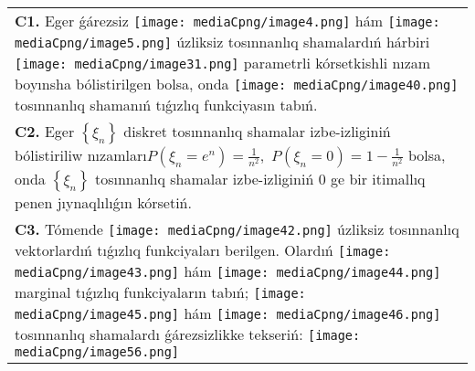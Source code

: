 \documentclass{article}
\begin{document}
\begin{tabular}{m{17cm}}
 \\
\textbf{C1.} Eger ǵárezsiz \texttt{[image: mediaCpng/image4.png]} hám \texttt{[image: mediaCpng/image5.png]} úzliksiz tosınnanlıq shamalardıń hárbiri \texttt{[image: mediaCpng/image31.png]} parametrli
kórsetkishli nızam boyınsha bólistirilgen bolsa, onda \texttt{[image: mediaCpng/image40.png]} tosınnanlıq shamanıń
tıǵızlıq funkciyasın tabıń.
 \\
\textbf{C2.} Eger \(\left\{ \xi_{n} \right\}\) diskret tosınnanlıq shamalar izbe-izliginiń bólistiriliw nızamları\(P(\xi_{n} = e^{n}) = \frac{1}{n^{2}},\) \(P(\xi_{n} = 0) = 1 - \frac{1}{n^{2}}\) bolsa, onda \(\left\{ \xi_{n} \right\}\) tosınnanlıq shamalar izbe-izliginiń 0 ge bir itimallıq penen jıynaqlılıǵın kórsetiń.
 \\
\textbf{C3.} Tómende \texttt{[image: mediaCpng/image42.png]} úzliksiz tosınnanlıq vektorlardıń tıǵızlıq funkciyaları berilgen. Olardıń \texttt{[image: mediaCpng/image43.png]} hám \texttt{[image: mediaCpng/image44.png]} marginal tıǵızlıq funkciyaların tabıń; \texttt{[image: mediaCpng/image45.png]} hám \texttt{[image: mediaCpng/image46.png]} tosınnanlıq shamalardı ǵárezsizlikke tekseriń: \texttt{[image: mediaCpng/image56.png]}
 \\

\end{tabular}
\vspace{1cm}
\end{document}
